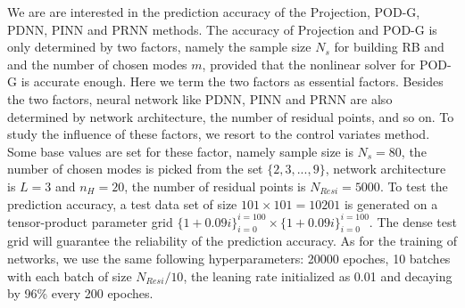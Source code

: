 \documentclass[preprint, 10pt]{elsarticle}
\begin{document}
We are are interested in the prediction accuracy of the Projection, POD-G, PDNN, PINN and PRNN methods. The accuracy of Projection and POD-G is only determined by two factors, namely the sample size $N_s$ for building RB and and the number of chosen modes $m$, provided that the nonlinear solver for POD-G is accurate enough. Here we term the two factors as essential factors.
Besides the two factors, neural network like PDNN, PINN and PRNN are also determined by network architecture, the number of residual points, and so on. To study the influence of these factors, we resort to the control variates method. Some base values are set for these factor, namely sample size is $N_s=80$, the number of chosen modes is picked from the set $\{2,3,...,9\}$,  network architecture is $L=3$ and $n_H=20$, the number of residual points is $N_{Resi}=5000$. To test the prediction accuracy, a test data set of size $101 \times 101=10201$ is generated on a tensor-product parameter grid $\{1+ 0.09i\}_{i=0}^{i=100} \times \{1+ 0.09i\}_{i=0}^{i=100}$. The dense test grid will guarantee the reliability of the prediction accuracy. As for the training of networks, we use the same following hyperparameters: 20000 epoches, 10 batches with each batch of size $N_{Resi}/10$, the leaning rate initialized as 0.01 and decaying by 96\% every 200 epoches.
\end{document}
